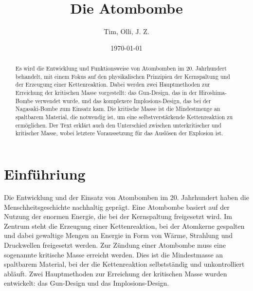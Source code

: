 \documentclass[a4paper,12pt]{article}
\title{Die Atombombe}
\author{Tim, Olli, J. Z.}
\date{\today}
\begin{document}
\pagestyle{fancy}

\fancyfoot[LE,RO]{\thepage}

\maketitle

\begin{abstract}
\noindent Es wird die Entwicklung und Funktionsweise von Atombomben im 20. Jahrhundert behandelt, mit einem Fokus auf den physikalischen Prinzipien der Kernspaltung und der Erzeugung einer Kettenreaktion. Dabei werden zwei Hauptmethoden zur Erreichung der kritischen Masse vorgestellt: das Gun-Design, das in der Hiroshima-Bombe verwendet wurde, und das komplexere Implosions-Design, das bei der Nagasaki-Bombe zum Einsatz kam. Die kritische Masse ist die Mindestmenge an spaltbarem Material, die notwendig ist, um eine selbstverstärkende Kettenreaktion zu ermöglichen. Der Text erklärt auch den Unterschied zwischen unterkritischer und kritischer Masse, wobei letztere Voraussetzung für das Auslösen der Explosion ist.
\end{abstract}

\tableofcontents

\newpage

\section{Einführiung}
Die Entwicklung und der Einsatz von Atombomben im 20. Jahrhundert haben die Menschheitsgeschichte nachhaltig geprägt. Eine Atombombe basiert auf der Nutzung der enormen Energie, die bei der Kernspaltung freigesetzt wird. Im Zentrum steht die Erzeugung einer Kettenreaktion, bei der Atomkerne gespalten und dabei gewaltige Mengen an Energie in Form von Wärme, Strahlung und Druckwellen freigesetzt werden.
Zur Zündung einer Atombombe muss eine sogenannte kritische Masse erreicht werden. Dies ist die Mindestmasse an spaltbarem Material, bei der die Kettenreaktion selbstständig und unkontrolliert abläuft. Zwei Hauptmethoden zur Erreichung der kritischen Masse wurden entwickelt: das Gun-Design und das Implosions-Design.
\end{document}
